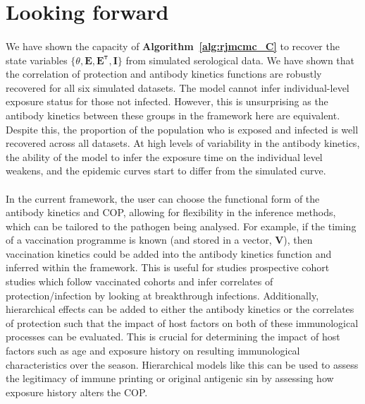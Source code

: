 \section{Looking forward}
\paragraph{}We have shown the capacity of \textbf{Algorithm~\ref{alg:rjmcmc_C}} to recover the state variables $\{\theta, \mathbf{E}, \mathbf{E^{\tau}}, \mathbf{I}\}$ from simulated serological data.\cite{Menezes2023-ti} We have shown that the correlation of protection and antibody kinetics functions are robustly recovered for all six simulated datasets. The model cannot infer individual-level exposure status for those not infected. However, this is unsurprising as the antibody kinetics between these groups in the framework here are equivalent. Despite this, the proportion of the population who is exposed and infected is well recovered across all datasets. At high levels of variability in the antibody kinetics, the ability of the model to infer the exposure time on the individual level weakens, and the epidemic curves start to differ from the simulated curve.

\paragraph{}In the current framework, the user can choose the functional form of the antibody kinetics and COP, allowing for flexibility in the inference methods, which can be tailored to the pathogen being analysed. For example, if the timing of a vaccination programme is known (and stored in a vector, $\mathbf{V}$), then vaccination kinetics could be added into the antibody kinetics function and inferred within the framework. This is useful for studies prospective cohort studies which follow vaccinated cohorts and infer correlates of protection/infection by looking at breakthrough infections. Additionally, hierarchical effects can be added to either the antibody kinetics or the correlates of protection such that the impact of host factors on both of these immunological processes can be evaluated. This is crucial for determining the impact of host factors such as age and exposure history on resulting immunological characteristics over the season. Hierarchical models like this can be used to assess the legitimacy of immune printing or original antigenic sin by assessing how exposure history alters the COP. 


